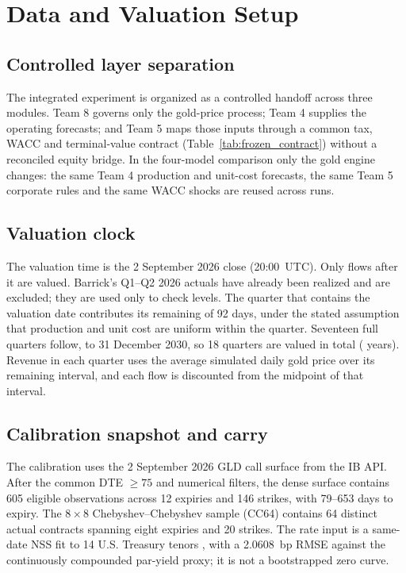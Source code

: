 \section{Data and Valuation Setup}

\subsection{Controlled layer separation}
The integrated experiment is organized as a controlled handoff across three modules. Team 8 governs only the gold-price process; Team 4 supplies the operating forecasts; and Team 5 maps those inputs through a common tax, WACC and terminal-value contract (Table~\ref{tab:frozen_contract}) without a reconciled equity bridge. In the four-model comparison only the gold engine changes: the same Team 4 production and unit-cost forecasts, the same Team 5 corporate rules and the same WACC shocks are reused across runs.

\subsection{Valuation clock}
The valuation time is the 2 September 2026 close (20:00~UTC). Only flows after it are valued. Barrick's Q1--Q2 2026 actuals have already been realized and are excluded; they are used only to check levels. The quarter that contains the valuation date contributes its remaining \StubDays{} of 92 days, under the stated assumption that production and unit cost are uniform within the quarter. Seventeen full quarters follow, to 31 December 2030, so 18 quarters are valued in total (\HorizonYears{} years). Revenue in each quarter uses the average simulated daily gold price over its remaining interval, and each flow is discounted from the midpoint of that interval.

\subsection{Calibration snapshot and carry}
The calibration uses the 2 September 2026 GLD call surface from the IB API. After the common DTE $\geq75$ and numerical filters, the dense surface contains 605 eligible observations across 12 expiries and 146 strikes, with 79--653 days to expiry. The $8\times8$ Chebyshev--Chebyshev sample (CC64) contains 64 distinct actual contracts spanning eight expiries and 20 strikes. The rate input is a same-date NSS fit to 14 U.S. Treasury tenors \citep{nss1994,treasury2026}, with a 2.0608~bp RMSE against the continuously compounded par-yield proxy; it is not a bootstrapped zero curve.

